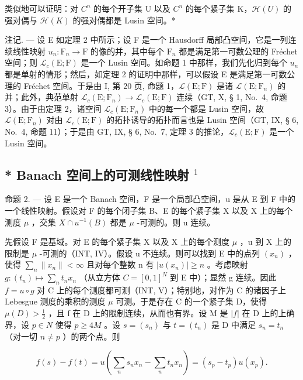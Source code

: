 类似地可以证明：对 \(C^{n}\) 的每个开子集 U 以及 \(C^{n}\) 的每个紧子集 K，\(\mathcal{H}(U)\) 的强对偶与 \(\mathcal{H}(K)\) 的强对偶都是 Lusin 空间。*

注记. --- 设 E 如定理 2 中所示；设 F 是一个 Hausdorff 局部凸空间，它是一列连续线性映射 \(u_n: \mathrm{F}_n \to \mathrm{F}\) 的像的并，其中每个 \(\mathrm{F}_n\) 都是满足第一可数公理的 Fréchet 空间；则 \(\mathcal{L}_c(\mathrm{E};\mathrm{F})\) 是一个 Lusin 空间。如命题 1 中那样，我们先化归到每个 \(u_n\) 都是单射的情形；然后，如定理 2 的证明中那样，可以假设 E 是满足第一可数公理的 Fréchet 空间。于是由 I, 第 20 页, 命题 1，\(\mathcal{L}(\mathrm{E};\mathrm{F})\) 是诸 \(\mathcal{L}(\mathrm{E};\mathrm{F}_n)\) 的并；此外，典范单射 \(\mathcal{L}_c(\mathrm{E};\mathrm{F}_n) \to \mathcal{L}_c(\mathrm{E};\mathrm{F})\) 连续（GT, X, § 1, No.~4, 命题 3）。由于由定理 2，诸空间 \(\mathcal{L}_c(\mathrm{E};\mathrm{F}_n)\) 中的每一个都是 Lusin 空间，故 \(\mathcal{L}(\mathrm{E};\mathrm{F}_n)\) 对由 \(\mathcal{L}_c(\mathrm{E};\mathrm{F})\) 的拓扑诱导的拓扑而言也是 Lusin 空间（GT, IX, § 6, No.~4, 命题 11）；于是由 GT, IX, § 6, No.~7, 定理 3 的推论，\(\mathcal{L}_c(\mathrm{E};\mathrm{F})\) 是一个 Lusin 空间。

\subsection{\texorpdfstring{* Banach 空间上的可测线性映射 \(^{1}\)}{Banach 空间上的可测线性映射 \^{}\{1\}}}

命题 2. --- 设 E 是一个 Banach 空间，F 是一个局部凸空间，u 是从 E 到 F 中的一个线性映射。假设对 F 的每个闭子集 B、E 的每个紧子集 X 以及 X 上的每个测度 \(\mu\) ，交集 \(X \cap u^{-1}(B)\) 都是 \(\mu\) -可测的。则 u 连续。

先假设 F 是基域。对 E 的每个紧子集 X 以及 X 上的每个测度 \(\mu\) ，u 到 X 上的限制是 \(\mu\) -可测的（INT, IV）。假设 u 不连续。则可以找到 E 中的点列 \((x_{n})\) ，使得 \(\sum_{n} \|x_{n}\| < \infty\) 且对每个整数 n 有 \(|u(x_{n})| \geqslant n\) 。考虑映射 \(g:(t_{n}) \mapsto \sum_{n} t_{n} x_{n}\) （从立方体 \(C = [0, 1]^{N}\) 到 E 中）；显然 g 连续。因此 \(f = u \circ g\) 对 C 上的每个测度都可测（INT, V）；特别地，对作为 C 的诸因子上 Lebesgue 测度的乘积的测度 \(\mu\) 可测。于是存在 C 的一个紧子集 D，使得 \(\mu(D) > \frac{1}{2}\) ，且 f 在 D 上的限制连续，从而也有界。设 M 是 \(|f|\) 在 D 上的上确界，设 \(p \in N\) 使得 \(p \geqslant 4M\) 。设 \(s = (s_{n})\) 与 \(t = (t_{n})\) 是 D 中满足 \(s_{n} = t_{n}\) （对一切 \(n \neq p\) ）的两个点。则

\[
f (s) - f (t) = u (\sum_ {n} s _ {n} x _ {n} - \sum_ {n} t _ {n} x _ {n}) = (s _ {p} - t _ {p}) u (x _ {p}).
\]

